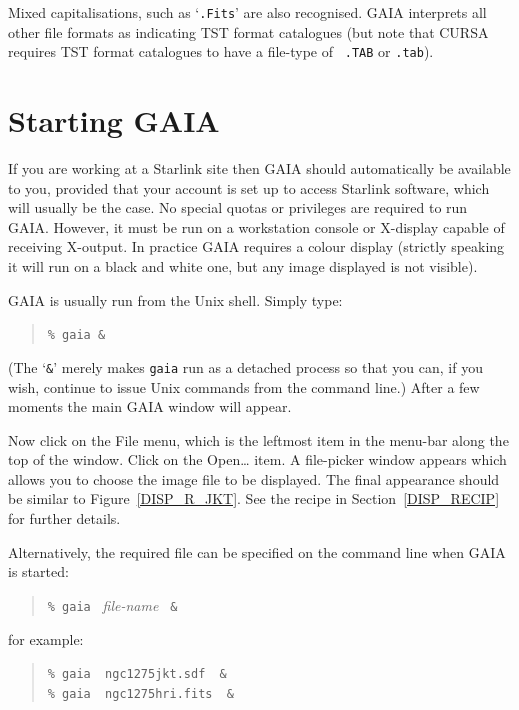 \documentclass[twoside,11pt]{article}
\newcommand{\xlabel}[1]{}
\begin{document}
Mixed capitalisations, such as `{\tt .Fits}' are also recognised.  GAIA
interprets all other file formats as indicating TST format catalogues (but
note that CURSA requires TST format catalogues to have a file-type of {\tt
.TAB} or {\tt .tab}).


\section{\xlabel{START}\label{START}Starting GAIA}

If you are working at a Starlink site then GAIA should automatically
be available to you, provided that your account is set up to access
Starlink software, which will usually be the case.  No special quotas or
privileges are required to run GAIA.  However, it must be run on a
workstation console or X-display capable of receiving X-output.  In
practice GAIA requires a colour display (strictly speaking it will run on
a black and white one, but any image displayed is not visible).

GAIA is usually run from the Unix shell.  Simply type:

\begin{quote}
{\tt \%  gaia \&}
\end{quote}

(The `{\tt \&}' merely makes {\tt gaia} run as a detached process so that
you can, if you wish, continue to issue Unix commands from the command
line.)  After a few moments the main GAIA window will appear.

Now click on the {\sf File} menu, which is the leftmost item in the
menu-bar along the top of the window.  Click on the {\sf Open\ldots}
item.  A file-picker window appears which allows you to choose the
image file to be displayed.  The final appearance should be similar to
Figure~\ref{DISP_R_JKT}.  See the recipe in Section~\ref{DISP_RECIP} for
further details.

Alternatively, the required file can be specified on the command line
when GAIA is started:

\begin{quote}
{\tt \%  gaia} {\it ~file-name} {\tt ~\&}
\end{quote}

for example:

\begin{quote}
{\tt \%  gaia ~ngc1275jkt.sdf ~\&} \\
{\tt \%  gaia ~ngc1275hri.fits  ~\&}
\end{quote}
\end{document}
